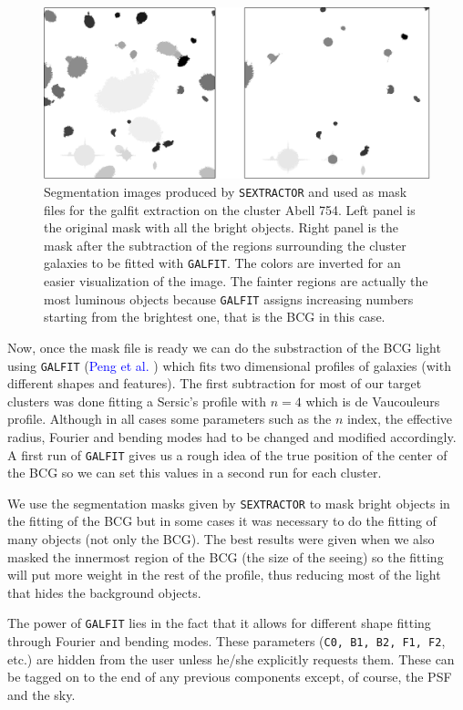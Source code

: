 \begin{figure}[H]
\centering
\includegraphics[width=15cm]{images/masks.png}
\caption[Segmentation images]{Segmentation images produced by \texttt{SEXTRACTOR} and used as mask files for the galfit extraction on the cluster Abell 754. Left panel is the original mask with all the bright objects. Right panel is the mask after the subtraction of the regions surrounding the cluster galaxies to be fitted with \texttt{GALFIT}. The colors are inverted for an easier visualization of the image. The fainter regions are actually the most luminous objects because \texttt{GALFIT} assigns increasing numbers starting from the brightest one, that is the BCG in this case.}
\end{figure}

Now, once the mask file is ready we can do the substraction of the BCG light using \texttt{GALFIT} (\textcolor{blue}{Peng et al.} \citeyear{Reference20}) which fits two dimensional profiles of galaxies (with different shapes and features). The first subtraction for most of our target clusters was done fitting a Sersic's profile with $n=4$ which is de Vaucouleurs profile. Although in all cases some parameters such as the $n$ index, the effective radius, Fourier and bending modes had to be changed and modified accordingly. A first run of \texttt{GALFIT} gives us a rough idea of the true position of the center of the BCG so we can set this values in a second run for each cluster. 

We use the segmentation masks given by \texttt{SEXTRACTOR} to mask bright objects in the fitting of the BCG but in some cases it was necessary to do the fitting of many objects (not only the BCG). The best results were given when we also masked the innermost region of the BCG (the size of the seeing) so the fitting will put more weight in the rest of the profile, thus reducing most of the light that hides the background objects.

The power of \texttt{GALFIT} lies in the fact that it allows for different shape fitting through Fourier and bending modes. These parameters (\texttt{C0, B1, B2, F1, F2}, etc.) are hidden from the user unless he/she explicitly requests them.  These can be tagged on to the end of any previous components except, of course, the PSF and the sky.  

